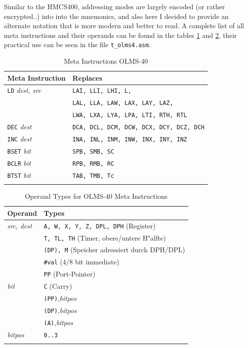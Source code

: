 \documentclass[12pt,twoside]{report}
\newcommand{\tty}[1]{{\tt #1}}
\begin{document}
Similar to the HMCS400, addressing modes are largely encoded (or
rather encrypted..) into into the mnemonics, and also here I
decided to provide an alternate notation that is more modern and
better to read.  A complete list of all meta instructions and
their operands can be found in the tables \ref{TabOLMS40Meta} and
\ref{TabOLMS40MetaOps}, their practical use can be seen in the
file \tty{t\_olms4.asm}.

\begin{center}\begin{longtable}{|l|l|}
\hline
Meta Instruction          & Replaces \\
\hline
\tty{LD} {\em dest, src}        & \tty{LAI, LLI, LHI, L,} \\
                                & \tty{LAL, LLA, LAW, LAX, LAY, LAZ,} \\
                                & \tty{LWA, LXA, LYA, LPA, LTI, RTH, RTL} \\
\tty{DEC} {\em dest}            & \tty{DCA, DCL, DCM, DCW, DCX, DCY, DCZ, DCH} \\
\tty{INC} {\em dest}            & \tty{INA, INL, INM, INW, INX, INY, INZ} \\
\tty{BSET} {\em bit}            & \tty{SPB, SMB, SC} \\
\tty{BCLR} {\em bit}            & \tty{RPB, RMB, RC} \\
\tty{BTST} {\em bit}            & \tty{TAB, TMB, Tc} \\
\hline
\caption{Meta Instructions OLMS-40}
\label{TabOLMS40Meta}
\end{longtable}\end{center}

\begin{center}\begin{longtable}{|l|l|}
\hline
Operand                 & Types \\
\hline
{\em src, dest}         & \tty{A, W, X, Y, Z, DPL, DPH} (Register) \\
                        & \tty{T, TL, TH} (Timer, obere/untere H"alfte) \\
                        & \tty{(DP), M} (Speicher adressiert durch DPH/DPL) \\
                        & \tty{\#val} (4/8 bit immediate) \\
                        & \tty{PP} (Port-Pointer) \\
{\em bit}               & \tty{C} (Carry) \\
                        & \tty{(PP)},{\em bitpos} \\
                        & \tty{(DP)},{\em bitpos} \\
                        & \tty{(A)},{\em bitpos} \\
{\em bitpos}            & \tty{0..3} \\
\hline
\caption{Operand Types for OLMS-40 Meta Instructions}
\label{TabOLMS40MetaOps}
\end{longtable}\end{center}
\end{document}
